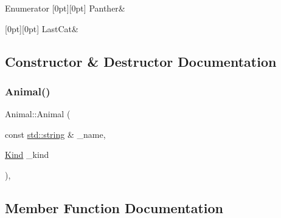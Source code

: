 \begin{DoxyEnumFields}{Enumerator}
[0pt][0pt]{}\mbox{\label{struct_animal_abd6bed3bf6361cc3dc37c03f297e3f48abcd8d4056b12fd3e0b2eea181eeb0123}} 
Panther&\\
\hline

[0pt][0pt]{}\mbox{\label{struct_animal_abd6bed3bf6361cc3dc37c03f297e3f48a62b19a66718d4f968c685feed59d4797}} 
Last\+Cat&\\
\hline

\end{DoxyEnumFields}


\subsection{Constructor \& Destructor Documentation}
\mbox{\label{struct_animal_af163de0cc8414e7f3ae8a18c848c42cc}} 
\subsubsection{\texorpdfstring{Animal()}{Animal()}}
{\footnotesize\ttfamily Animal\+::\+Animal (\begin{DoxyParamCaption}\item[{const \mbox{\hyperlink{_s_d_l__opengl__glext_8h_ab4ccfaa8ab0e1afaae94dc96ef52dde1}{std\+::string}} \&}]{\+\_\+name,  }\item[{\mbox{\hyperlink{struct_animal_abd6bed3bf6361cc3dc37c03f297e3f48}{Kind}}}]{\+\_\+kind }\end{DoxyParamCaption})\hspace{0.3cm}{\ttfamily [inline]}, {\ttfamily [protected]}}



\subsection{Member Function Documentation}
\mbox{\label{struct_animal_a2e88b21d676b809b69a8e2adf6d6e52e}} 

